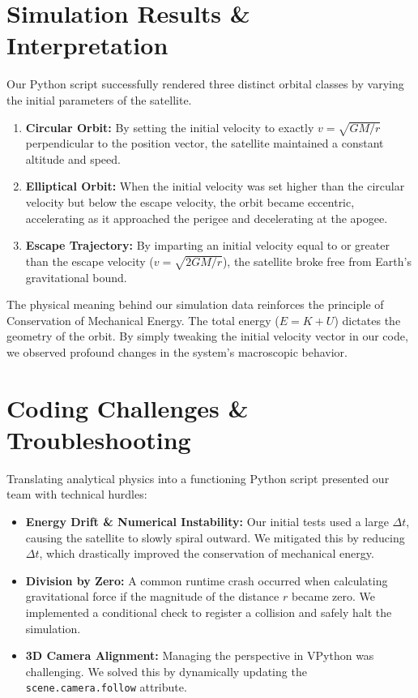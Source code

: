\documentclass[12pt]{article}
\begin{document}
\section{Simulation Results \& Interpretation}
Our Python script successfully rendered three distinct orbital classes by varying the initial parameters of the satellite. 

\begin{enumerate}
    \item \textbf{Circular Orbit:} By setting the initial velocity to exactly $v = \sqrt{GM/r}$ perpendicular to the position vector, the satellite maintained a constant altitude and speed.
    
    \item \textbf{Elliptical Orbit:} When the initial velocity was set higher than the circular velocity but below the escape velocity, the orbit became eccentric, accelerating as it approached the perigee and decelerating at the apogee.
    
    \item \textbf{Escape Trajectory:} By imparting an initial velocity equal to or greater than the escape velocity ($v = \sqrt{2GM/r}$), the satellite broke free from Earth's gravitational bound.
\end{enumerate}

The physical meaning behind our simulation data reinforces the principle of Conservation of Mechanical Energy. The total energy ($E = K + U$) dictates the geometry of the orbit. By simply tweaking the initial velocity vector in our code, we observed profound changes in the system's macroscopic behavior.

\section{Coding Challenges \& Troubleshooting}
Translating analytical physics into a functioning Python script presented our team with technical hurdles:

\begin{itemize}
    \item \textbf{Energy Drift \& Numerical Instability:} Our initial tests used a large $\Delta t$, causing the satellite to slowly spiral outward. We mitigated this by reducing $\Delta t$, which drastically improved the conservation of mechanical energy.
    \item \textbf{Division by Zero:} A common runtime crash occurred when calculating gravitational force if the magnitude of the distance $r$ became zero. We implemented a conditional check to register a collision and safely halt the simulation.
    \item \textbf{3D Camera Alignment:} Managing the perspective in VPython was challenging. We solved this by dynamically updating the \texttt{scene.camera.follow} attribute.
\end{itemize}
\end{document}
